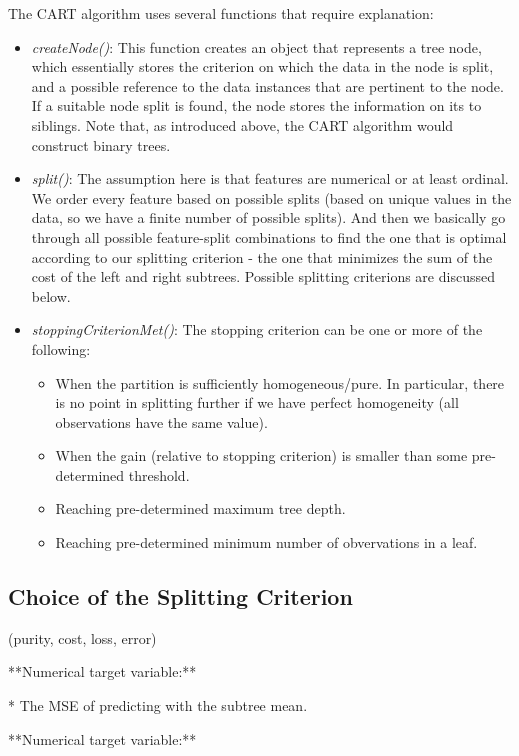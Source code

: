 The CART algorithm uses several functions that require explanation:
\begin{itemize}
\item {\em createNode()}: This function creates an object that represents a tree node, which essentially stores the criterion on which the data in the node is split, and a possible reference to the data instances that are pertinent to the node. If a suitable node split is found, the node stores the information on its to siblings. Note that, as introduced above, the CART algorithm would construct binary trees.
\item {\em split()}: The assumption here is that features are numerical or at least ordinal. We order every feature based on possible splits (based on unique values in the data, so we have a finite number of possible splits). And then we basically go through all possible feature-split combinations to find the one that is optimal according to our splitting criterion - the one that minimizes the sum of the cost of the left and right subtrees. Possible splitting criterions are discussed below.

\item {\em stoppingCriterionMet()}: The stopping criterion can be one or more of the following:
\begin{itemize}
\item When the partition is sufficiently homogeneous/pure. In particular, there is no point in splitting further if we have perfect homogeneity (all observations have the same value).
\item When the gain (relative to stopping criterion) is smaller than some pre-determined threshold.
\item Reaching pre-determined maximum tree depth.
\item Reaching pre-determined minimum number of obvervations in a leaf.
\end{itemize}
\end{itemize}

\subsection*{Choice of the Splitting Criterion}


(purity, cost, loss, error)

**Numerical target variable:**

* The MSE of predicting with the subtree mean.

**Numerical target variable:**

